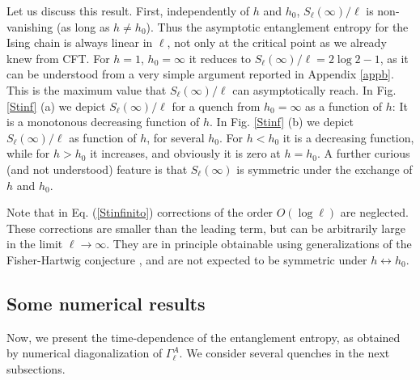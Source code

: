 \documentclass[12pt,preprint,tighten,eqsecnum,aps,floats,psfig,epsfig,amsmath,onecolumn]{revtex4-1}
\begin{document}
Let us discuss this result. 
First, independently of $h$ and $h_0$,  $S_\ell(\infty)/\ell$ is 
non-vanishing (as long as $h\neq h_0$). 
Thus the asymptotic entanglement entropy for the Ising chain is always linear
in $\ell$, not only at the critical point as we already knew from CFT.  
For $h=1$, $h_0=\infty$ it reduces to $S_\ell(\infty)/\ell=2 \log2-1$, 
as it can be understood from a very simple argument reported in 
Appendix \ref{appb}. 
This is the maximum value that $S_\ell(\infty)/\ell$ can asymptotically reach.
In Fig. \ref{Stinf} (a) we depict $S_\ell(\infty)/\ell$ for a quench from 
$h_0=\infty$ as a function of $h$: It is a monotonous decreasing function of 
$h$. 
In Fig. \ref{Stinf} (b) we depict $S_\ell(\infty)/\ell$ as function of $h$, for 
several $h_0$. 
For $h<h_0$ it is a decreasing function, while for $h>h_0$ it increases, and 
obviously it is zero at $h=h_0$.
A further curious (and not understood) feature is that $S_\ell(\infty)$ is 
symmetric under the exchange of $h$ and $h_0$.

Note that in Eq. (\ref{Stinfinito}) corrections of the order $O(\log \ell)$
are neglected. These corrections are smaller than the leading term, but can be
arbitrarily large in the limit $\ell\rightarrow\infty$. 
They are in principle obtainable using generalizations 
of the Fisher-Hartwig conjecture \cite{ijk-04}, and are not expected 
to be symmetric under $h\leftrightarrow h_0$.


\subsection{Some numerical results}

Now, we present the time-dependence of the entanglement entropy, as 
obtained by numerical diagonalization of $\Gamma^A_\ell$.
We consider several quenches in the next subsections.
\end{document}
